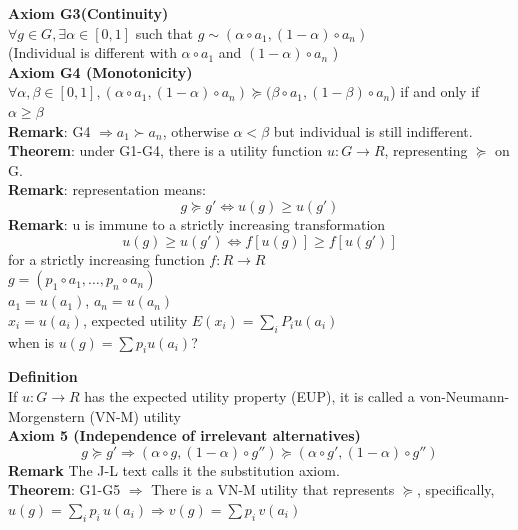 \documentclass[letterpaper,13pt,single,pdftex]{scrartcl}
\begin{document}
\textbf{Axiom G3(Continuity)}\\
$\forall g \in G, \exists \alpha \in [0,1]$ such that $g \sim(\alpha \circ a_1, (1-\alpha)\circ a_n)$\\
(Individual is different with $\alpha \circ a_1$ and $(1-\alpha)\circ a_n$ )\\

\textbf{Axiom G4 (Monotonicity)}\\
$\forall \alpha, \beta \in [0,1],(\alpha \circ a_1, (1-\alpha)\circ a_n) \succeq (\beta \circ a_1, ( 1-\beta)\circ  a_n$)  if and only if $\alpha \ge \beta$\\
\textbf{Remark}: G4 $\Rightarrow a_1 \succ a_n $, otherwise $\alpha < \beta $ but individual is still indifferent. \\

\textbf{Theorem}: under G1-G4, there is a utility function $u: G \rightarrow R$, representing $\succeq$ on G. \\
    \textbf{Remark}: representation means: \\
\[g\succeq g'\iff u(g) \ge u(g')\]
\textbf{Remark}: u is immune to a strictly increasing transformation 
\[
u(g) \ge u(g') \iff f[u(g)] \ge f[u(g')]\] 
for a strictly increasing function $f: R \rightarrow R$\\

$g = (p_1\circ a_1,\dots, p_n \circ a_n) $\\
$a_1 = u(a_1)$,     $a_n = u(a_n)$\\
$ x_i = u(a_i)$, expected utility $E(x_i) = \sum\limits_{i}P_i u(a_i)$ \\
when is $u(g) = \sum p_i u(a_i)$?

\textbf{Definition}\\
If $u: G\rightarrow R$ has the expected utility property (EUP), it is called a von-Neumann-Morgenstern (VN-M) utility\\

\textbf{Axiom 5 (Independence of irrelevant alternatives)}
\[g\succeq g' \Rightarrow ( \alpha \circ g, (1-\alpha)\circ g'') \succeq (\alpha \circ g',(1-\alpha)\circ g'')\]
\textbf{Remark} The J-L text calls it the substitution axiom.\\
\textbf{Theorem}: G1-G5 $\Rightarrow$ There is a VN-M utility that represents $\succeq$, specifically, $u(g) = \sum\limits_{i}p_i\,u(a_i)\Rightarrow v(g) = \sum p_i\,v(a_i)$\\
\end{document}
